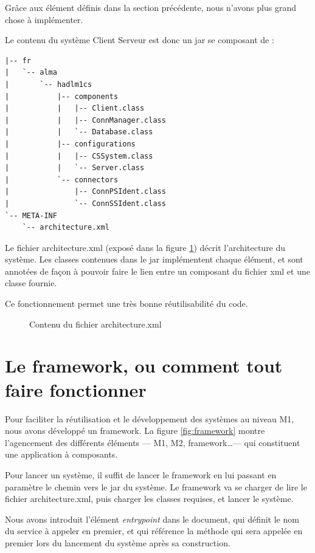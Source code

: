 \documentclass[french,a4paper,titlepage]{article}
\begin{document}
		Grâce aux élément définis dans la section précédente, nous n'avons plus grand chose à implémenter.
		
		Le contenu du système Client Serveur est donc un jar se composant de :
		
		\begin{verbatim}
|-- fr
|   `-- alma
|       `-- hadlm1cs
|           |-- components
|           |   |-- Client.class
|           |   |-- ConnManager.class
|           |   `-- Database.class
|           |-- configurations
|           |   |-- CSSystem.class
|           |   `-- Server.class
|           `-- connectors
|               |-- ConnPSIdent.class
|               `-- ConnSSIdent.class
`-- META-INF
    `-- architecture.xml
		\end{verbatim}
		
		
		Le fichier architecture.xml (exposé dans la figure \ref{fig:architecture.xml}) décrit l'architecture du système. Les classes contenues dans le jar implémentent chaque élément, et sont annotées de façon à pouvoir faire le lien entre un composant du fichier xml et une classe fournie.
		
		Ce fonctionnement permet une très bonne réutilisabilité du code.
		
		
		\begin{figure}[htb]
			\centering
			
			\caption{Contenu du fichier architecture.xml}
			\label{fig:architecture.xml}

		\end{figure}
	
	\section{Le framework, ou comment tout faire fonctionner}
	
		Pour faciliter la réutilisation et le développement des systèmes au niveau M1, nous avons développé un framework. La figure \ref{fig:framework} montre l'agencement des différents éléments --- M1, M2, framework\dots --- qui constituent une application à composants.
		
		Pour lancer un système, il suffit de lancer le framework en lui passant en paramètre le chemin vers le jar du système. Le framework va se charger de lire le fichier architecture.xml, puis charger les classes requises, et lancer le système.
		
		Nous avons introduit l'élément \emph{entrypoint} dans le document, qui définit le nom du service à appeler en premier, et qui référence la méthode qui sera appelée en premier lors du lancement du système après sa construction.
		
\end{document}
